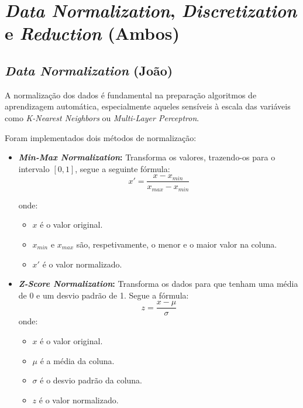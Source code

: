 
\section{\textit{Data Normalization}, \textit{Discretization} e \textit{Reduction} (Ambos)}
\label{chap3:data}

\subsection{\textit{Data Normalization} (João)}
\label{chap3:data_norm}

A normalização dos dados é fundamental na preparação algoritmos de aprendizagem automática, especialmente aqueles sensíveis à escala das variáveis como \textit{K-Nearest Neighbors} ou \textit{Multi-Layer Perceptron}.

Foram implementados dois métodos de normalização:

\begin{itemize}
    \item \textbf{\textit{Min-Max Normalization}:} Transforma os valores, trazendo-os para o intervalo \([0, 1]\), segue a seguinte fórmula:
    \[
    x' = \frac{x - x_{min}}{x_{max} - x_{min}}
    \]
    
    onde:
    \begin{itemize}
        \item \( x \) é o valor original.
        \item \( x_{min} \) e \( x_{max} \) são, respetivamente, o menor e o maior valor na coluna.
        \item \( x' \) é o valor normalizado.
    \end{itemize}

    \item \textbf{\textit{Z-Score Normalization}:} Transforma os dados para que tenham uma média de 0 e um desvio padrão de 1. Segue a fórmula:
    \[
    z = \frac{x - \mu}{\sigma}
    \]
    onde:
    \begin{itemize}
        \item \( x \) é o valor original.
        \item \( \mu \) é a média da coluna.
        \item \( \sigma \) é o desvio padrão da coluna.
        \item \( z \) é o valor normalizado.
    \end{itemize}
\end{itemize}

